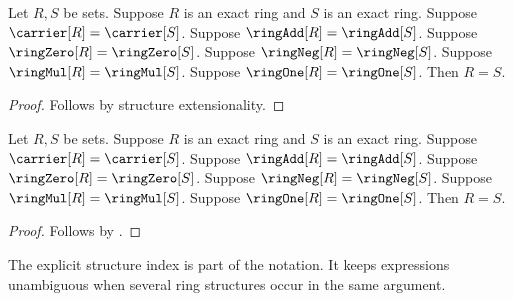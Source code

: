 \begin{struct}
\end{struct}

\begin{theorem}\label{exact_ring_extensionality}
    Let $R,S$ be sets.
    Suppose $R$ is an exact ring and $S$ is an exact ring.
    Suppose $\carrier[R]=\carrier[S]$.
    Suppose $\ringAdd[R]=\ringAdd[S]$.
    Suppose $\ringZero[R]=\ringZero[S]$.
    Suppose $\ringNeg[R]=\ringNeg[S]$.
    Suppose $\ringMul[R]=\ringMul[S]$.
    Suppose $\ringOne[R]=\ringOne[S]$.
    Then $R=S$.
\end{theorem}
\begin{proof}
    Follows by structure extensionality.
\end{proof}

\begin{theorem}\label{exact_ring_equality_from_fields}
    Let $R,S$ be sets.
    Suppose $R$ is an exact ring and $S$ is an exact ring.
    Suppose $\carrier[R]=\carrier[S]$.
    Suppose $\ringAdd[R]=\ringAdd[S]$.
    Suppose $\ringZero[R]=\ringZero[S]$.
    Suppose $\ringNeg[R]=\ringNeg[S]$.
    Suppose $\ringMul[R]=\ringMul[S]$.
    Suppose $\ringOne[R]=\ringOne[S]$.
    Then $R=S$.
\end{theorem}
\begin{proof}
    Follows by .
\end{proof}

The explicit structure index is part of the notation.  It keeps expressions
unambiguous when several ring structures occur in the same argument.

